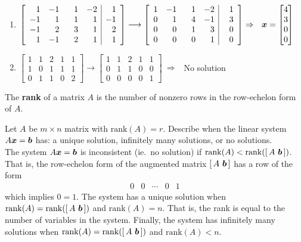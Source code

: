 \begin{example}
\begin{enumerate}
\item $\left[ \begin{array}{rrrr|r} 1 & -1 & \phantom{+}1 & -2 & 1 \\ -1 & 1 & 1 & 1 & -1 \\ -1 & 2 & 3 & 1 & 2 \\ 1 & -1 & 2 & 1 & 1 \end{array} \right] \longrightarrow \left[ \begin{array}{rrrr|r} 1 & -1 & \phantom{+}1 & -2 & \phantom{+}1 \\ 0 & 1 & 4 & -1 & 3 \\ 0 & 0 & 1 & 3 & 0 \\ 0 & 0 & 0 & 1 & 0 \end{array} \right]  \Rightarrow \ \ \boldsymbol{x} = \begin{bmatrix} 4 \\ 3 \\ 0 \\ 0 \end{bmatrix}$
\item $\left[ \begin{array}{rrrr|r} 1 & 1 & 2 & 1 & 1 \\ 1 & 0 & 1 & 1 & 1 \\ 0 & 1 & 1 & 0 & 2 \end{array} \right] \longrightarrow \left[ \begin{array}{rrrr|r} 1 & 1 & 2 & 1 & 1 \\ 0 & 1 & 1 & 0 & 0 \\ 0 & 0 & 0 & 0 & 1 \end{array} \right] \ \Rightarrow \ \ $ No solution
\end{enumerate}
\end{example}

\begin{definition}
The {\bf rank} of a matrix $A$ \cite[p.16]{KN} is the number of nonzero rows in the row-echelon form of $A$.
\end{definition}

\begin{example} Let $A$ be $m \times n$ matrix with $\mathrm{rank}(A) = r$. Describe when the linear system $A \boldsymbol{x} = \boldsymbol{b}$ has: a unique solution, infinitely many solutions, or no solutions. \\

The system $A \boldsymbol{x} = \boldsymbol{b}$ is inconsistent (ie.~no solution) if $\mathrm{rank}(A) < \mathrm{rank}([ \, A \ \boldsymbol{b} \, ])$. That is, the row-echelon form of the augmented matrix $[ \, A \ \boldsymbol{b} \, ]$ has a row of the form
$$
\begin{array}{rrrr|r} 0 & 0 & \cdots & 0 & 1 \end{array}
$$
which implies $0 = 1$. The system has a unique solution when $\mathrm{rank}(A) = \mathrm{rank}([ \, A \ \boldsymbol{b} \, ])$ and $\mathrm{rank}(A) = n$. That is, the rank is equal to the number of variables in the system. Finally, the system has infinitely many solutions when $\mathrm{rank}(A) = \mathrm{rank}([ \, A \ \boldsymbol{b} \, ])$ and $\mathrm{rank}(A) < n$.
\end{example}